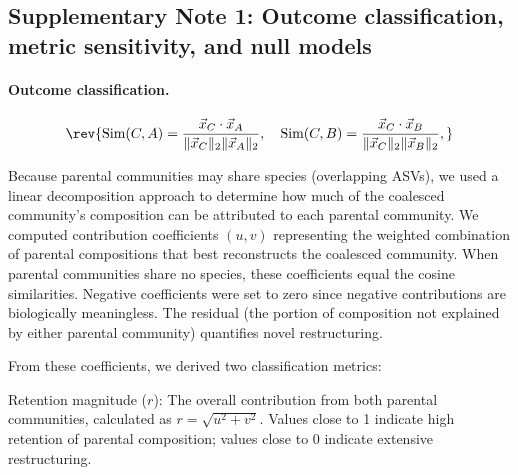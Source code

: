
\subsection*{Supplementary Note 1: Outcome classification, metric sensitivity, and null models}
\label{sec:suppl:note1}

\paragraph{Outcome classification.}
\begin{equation}
\rev{\text{Sim}(C, A) = \frac{\vec{x}_C \cdot \vec{x}_A}{\|\vec{x}_C\|_2 \|\vec{x}_A\|_2}, \quad
\text{Sim}(C, B) = \frac{\vec{x}_C \cdot \vec{x}_B}{\|\vec{x}_C\|_2 \|\vec{x}_B\|_2},}
\end{equation}

Because parental communities may share species (overlapping ASVs), we used a linear decomposition approach to determine how much of the coalesced community's composition can be attributed to each parental community. We computed contribution coefficients $(u, v)$ representing the weighted combination of parental compositions that best reconstructs the coalesced community. When parental communities share no species, these coefficients equal the cosine similarities. Negative coefficients were set to zero since negative contributions are biologically meaningless. The residual (the portion of composition not explained by either parental community) quantifies novel restructuring.

From these coefficients, we derived two classification metrics:

Retention magnitude ($r$): The overall contribution from both parental communities, calculated as $r = \sqrt{u^2 + v^2}$. Values close to 1 indicate high retention of parental composition; values close to 0 indicate extensive restructuring.

